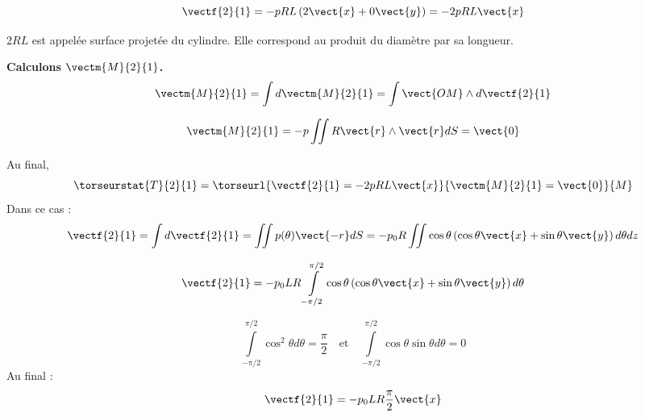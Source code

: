 \begin{corrigebox}
$$
\vectf{2}{1}
= -p R L \left(2\vect{x}
+0\vect{y}
\right) = -2pRL\vect{x}
$$

$2RL$ est appelée surface projetée du cylindre. Elle correspond au produit du diamètre par sa longueur.

\vspace{.5cm}

\textbf{Calculons $\vectm{M}{2}{1}$.}
$$
\vectm{M}{2}{1} = \int d\vectm{M}{2}{1}= \int \vect{OM}\wedge d\vectf{2}{1}
$$

$$
\vectm{M}{2}{1} = -p \iint R\vect{r} \wedge \vect{r}dS = \vect{0}
$$

Au final, 
$$
\torseurstat{T}{2}{1} = \torseurl{\vectf{2}{1} = -2pRL\vect{x}}{\vectm{M}{2}{1} =  \vect{0}}{M}
$$
Dans ce cas : 
$$
\vectf{2}{1} = \int d\vectf{2}{1} = \iint p(\theta) \vect{-r} dS 
= - p_0R\iint\cos\theta  \left(\cos\theta\vect{x}+\sin\theta\vect{y} \right)  d\theta dz$$

$$
\vectf{2}{1} 
= - p_0 L R\int\limits_{-\pi/2}^{\pi/2}\cos\theta  \left(\cos\theta\vect{x}+\sin\theta\vect{y} \right)  d\theta$$

$$
\int\limits_{-\pi/2}^{\pi/2}\cos^2\theta  d\theta = \dfrac{\pi}{2}
\quad 
\text{et}
\quad
\int\limits_{-\pi/2}^{\pi/2}\cos\theta \sin\theta  d\theta = 0
$$
Au final :
$$
\vectf{2}{1} 
= - p_0 L R \dfrac{\pi}{2}\vect{x}$$
\end{corrigebox}
